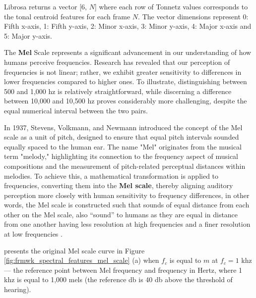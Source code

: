 Librosa returns a vector  [6, $N$] where each row of Tonnetz values corresponds to the tonal centroid features for each frame $N$. The vector dimensions represent 0: Fifth x-axis, 1: Fifth y-axis, 2: Minor x-axis, 3: Minor y-axis, 4: Major x-axis and 5: Major y-axis.


The \textbf{Mel} Scale represents a significant advancement in our understanding of how humans perceive frequencies. Research has revealed that our perception of frequencies is not linear; rather, we exhibit greater sensitivity to differences in lower frequencies compared to higher ones. To illustrate, distinguishing between 500 and 1,000 \gls{hz} is relatively straightforward, while discerning a difference between 10,000 and 10,500 \gls{hz} proves considerably more challenging, despite the equal numerical interval between the two pairs. 

In 1937, Stevens, Volkmann, and Newmann introduced the concept of the Mel scale as a unit of pitch, designed to ensure that equal pitch intervals sounded equally spaced to the human ear. The name "Mel" originates from the musical term "melody," highlighting its connection to the frequency aspect of musical compositions and the measurement of pitch-related perceptual distances within melodies. To achieve this, a mathematical transformation is applied to frequencies, converting them into the \textbf{Mel scale}, thereby aligning auditory perception more closely with human sensitivity to frequency differences, in other words, the Mel scale is constructed such that sounds of equal distance from each other on the Mel scale, also “sound” to humans as they are equal in distance from one another having less resolution at high frequencies and a finer resolution at low frequencies \cite{Moore2013}. 

\textcite{Park2008} presents the original Mel scale curve in Figure \ref{fig:frmwk_spectral_features_mel_scale} (a) when $f_c$ is equal to $m$ at $f_c = 1$ \gls{k}\gls{hz} — the reference point between Mel frequency and frequency in Hertz, where 1 \gls{k}\gls{hz} is equal to 1,000 mels (the reference \gls{db} is 40 \gls{db} above the threshold of hearing). 

